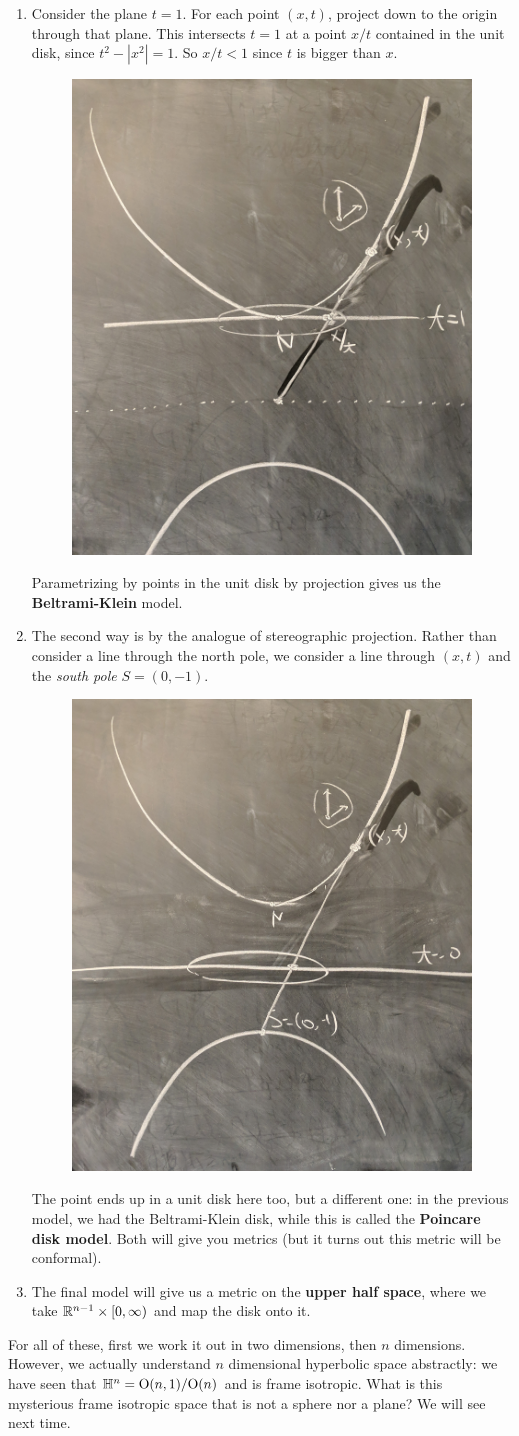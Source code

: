  \begin{enumerate}[label=(\arabic*)]
     \item Consider the plane $t=1$. For each point $(x,t)$, project down to the origin through that plane. This intersects $t=1$ at a point $x /t$ contained in the unit disk, since $t^2-|x^2|=1$. So $x /t<1$ since $t$ is bigger than $x$.

\begin{figure}[H]
\centering
\includegraphics[width=0.4\linewidth]{figures/rgeo_lec5.2.jpg}
\end{figure}

         Parametrizing by points in the unit disk by projection gives us the \textbf{Beltrami-Klein} model.
     \item The second way is by the analogue of stereographic projection. Rather than consider a line through the north pole, we consider a line through $(x,t)$ and the \emph{south pole} $S=(0,-1)$. 

\begin{figure}[H]
\centering
\includegraphics[width=0.4\linewidth]{figures/rgeo_lec5.3.jpg}
\end{figure}

         The point ends up in a unit disk here too, but a different one: in the previous model, we had the Beltrami-Klein disk, while this is called the \textbf{Poincare disk model}. Both will give you metrics (but it turns out this metric will be conformal).
     \item The final model will give us a metric on the \textbf{upper half space}, where we take $\mathbb{R}^{n-1}\times [0,\infty)$ and map the disk onto it.
 \end{enumerate}
 For all of these, first we work it out in two dimensions, then $n$ dimensions. However, we actually understand $n$ dimensional hyperbolic space abstractly: we have seen that $\mathbb{H}^n =\mathrm O(n,1)/\mathrm O(n) $ and is frame isotropic. What is this mysterious frame isotropic space that is not a sphere nor a plane? We will see next time.

